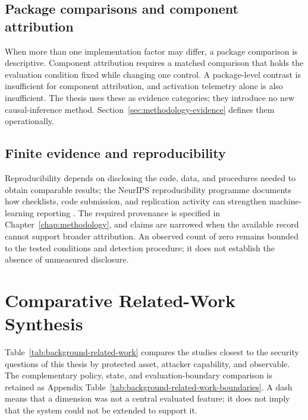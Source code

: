 \subsection{Package comparisons and component attribution}

When more than one implementation factor may differ, a package comparison is descriptive. Component attribution requires a matched comparison that holds the evaluation condition fixed while changing one control. A package-level contrast is insufficient for component attribution, and activation telemetry alone is also insufficient. The thesis uses these as evidence categories; they introduce no new causal-inference method. Section~\ref{sec:methodology-evidence} defines them operationally.

\subsection{Finite evidence and reproducibility}

Reproducibility depends on disclosing the code, data, and procedures needed to obtain comparable results; the NeurIPS reproducibility programme documents how checklists, code submission, and replication activity can strengthen machine-learning reporting \citep{pineau2021reproducibility}. The required provenance is specified in Chapter~\ref{chap:methodology}, and claims are narrowed when the available record cannot support broader attribution. An observed count of zero remains bounded to the tested conditions and detection procedure; it does not establish the absence of unmeasured disclosure.

\section{Comparative Related-Work Synthesis}
\label{sec:background-related-work}

Table~\ref{tab:background-related-work} compares the studies closest to the security questions of this thesis by protected asset, attacker capability, and observable. The complementary policy, state, and evaluation-boundary comparison is retained as Appendix Table~\ref{tab:background-related-work-boundaries}. A dash means that a dimension was not a central evaluated feature; it does not imply that the system could not be extended to support it.

